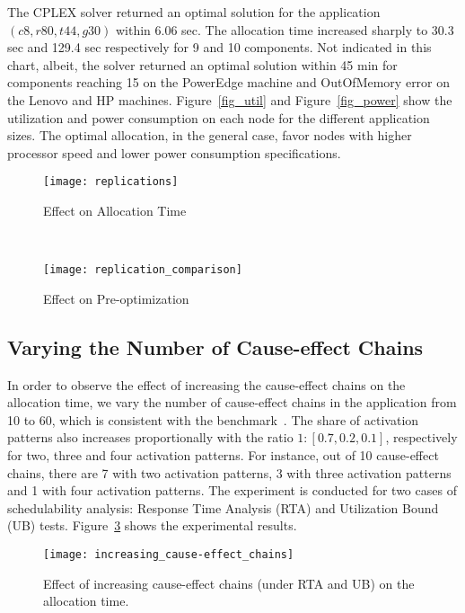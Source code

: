 The CPLEX solver returned an optimal solution for the application $(c8, r80,t44,g30)$ within 6.06 sec. The allocation time increased sharply to 30.3 sec and 129.4 sec respectively for 9 and 10 components. Not indicated in this chart, albeit, the solver returned an optimal solution within 45 min for components reaching 15 on the PowerEdge machine and OutOfMemory error on the Lenovo and HP machines. Figure~\ref{fig_util} and Figure~\ref{fig_power} show the utilization and power consumption on each node for the different application sizes. The optimal allocation, in the general case, favor nodes with higher processor speed and lower power consumption specifications.
\begin{figure*}[h]
    \centering
    \begin{subfigure}[b]{0.45  \textwidth}
        \texttt{[image: replications]}
        \caption{Effect on Allocation Time}
        \label{fig_replication_1}
    \end{subfigure}
    ~
        \begin{subfigure}[b]{0.45\textwidth}
        \texttt{[image: replication\_comparison]}
        \caption{Effect on Pre-optimization}
        \label{fig_replication_2}
    \end{subfigure}
    \caption{Effect of varying the component replications on the allocation time.}
    \label{fig_replication}
\end{figure*}
\subsection{Varying the Number of Cause-effect Chains} 
In order to observe the effect of increasing the cause-effect chains on the allocation time, we vary the number of cause-effect chains in the application from 10 to 60, which is consistent with the benchmark~\cite{Kramer2015RealFree}. The share of activation patterns also increases proportionally with the ratio $1:[0.7, 0.2, 0.1]$, respectively for two, three and four activation patterns. For instance, out of 10 cause-effect chains, there are 7 with two activation patterns, 3 with three activation patterns and 1 with four activation patterns. The experiment is conducted for two cases of schedulability analysis: Response Time Analysis (RTA) and Utilization Bound (UB) tests. Figure~\ref{chart_cause_effect_chain} shows the experimental results.
\begin{figure}[h]
\centering
\texttt{[image: increasing\_cause-effect\_chains]}
\caption{Effect of increasing cause-effect chains (under RTA and UB) on the allocation time.}
\label{chart_cause_effect_chain}
\end{figure}

